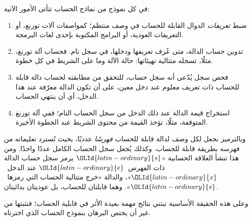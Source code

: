\documentclass[../../../include/open-logic-section]{subfiles}
\begin{document}

في كل نموذج من نماذج الحساب تتأتى الأمور الآتية:
\begin{enumerate}
\item ضبط \emph{تعريفات} الدوال القابلة للحساب في وصف منتظم؛
  كمواصفات آلات تورنغ، أو التعريفات العودية، أو البرامج المكتوبة
  بإحدى لغات البرمجة.
\item تدوين حساب الدالة، متى عُرف تعريفها ودخلها، في سجل تام. فحساب
  آلة تورنغ، مثلًا، تسجله متتالية تهيئاتها: حالة الآلة وما على
  الشريط في كل خطوة.
\item فحص سجل يُدّعى أنه سجل حساب، للتحقق من مطابقته لحساب
  دالة قابلة للحساب ذات تعريف معلوم عند دخل معين، على أن تكون الدالة معرّفة
  عند هذا الدخل، أي أن ينتهي الحساب.
\item استخراج قيمة الدالة عند ذلك الدخل من سجل
  الحساب التام؛ ففي آلة تورنغ المتوقفة، مثلًا، تؤخذ القيمة من محتوى الشريط
  عند الخطوة الأخيرة.
\end{enumerate}

وبالترميز نجعل لكل وصف لدالة قابلة للحساب \emph{فهرسًا} عدديًا،
بحيث تُسترد تعليماته من فهرسه بطريقة قابلة
للحساب. وكذلك يُجعل سجل الحساب الكامل عددًا واحدًا. ومن هذا
تنشأ العلاقة الحسابية «$\OLId{latin-ordinary}{s}$ يرمز سجل حساب الدالة ذات الفهرس~$\OLId{latin-ordinary}{e}$
عند الدخل~$\OLId{latin-ordinary}{x}$»، والدالة «خرج متتالية الحساب التي رمزها~$\OLId{latin-ordinary}{s}$». وهما قابلتان
للحساب، بل عوديتان بدائيتان.

وعلى هذه الحقيقة الأساسية تبتني نتائج مهمة بعيدة الأثر
في قابلية الحساب؛ فنثبتها من غير أن يختص البرهان بنموذج الحساب
الذي اخترناه.
\end{document}

